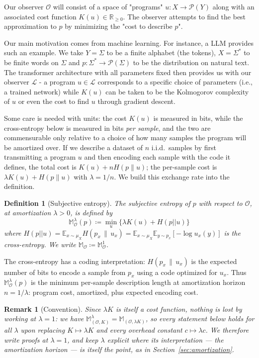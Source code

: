 \documentclass[11pt]{article}
\newtheorem{definition}{Definition}
\newtheorem{remark}{Remark}
\begin{document}
Our observer $\mathcal O$ will consist of a space of "programs" $u: X \to \mathcal P(Y)$ along with an associated cost function $K(u) \in \mathbb R_{\geq 0}$. The observer attempts to find the best approximation to $p$ by minimizing the "cost to describe $p$".

Our main motivation comes from machine learning. For instance, a LLM provides such an example. We take $Y = \Sigma$ to be a finite alphabet (the tokens), $X = \Sigma^*$ to be finite words on $\Sigma$ and $p: \Sigma^* \to \mathcal P(\Sigma)$ to be the distribution on natural text. The transformer architecture with all parameters fixed then provides us with our observer $\mathcal L$ - a program $u \in \mathcal L$ corresponds to a specific choice of parameters (i.e., a trained network) while $K(u)$ can be taken to be the Kolmogorov complexity of $u$ or even the cost to find $u$ through gradient descent.

Some care is needed with units: the cost $K(u)$ is measured in bits, while the cross-entropy below is measured in bits \emph{per sample}, and the two are commensurable only relative to a choice of how many samples the program will be amortized over. If we describe a dataset of $n$ i.i.d.\ samples by first transmitting a program $u$ and then encoding each sample with the code it defines, the total cost is $K(u) + n H(p\|u)$; the per-sample cost is $\lambda K(u) + H(p\|u)$ with $\lambda = 1/n$. We build this exchange rate into the definition.

\begin{definition}[Subjective entropy]
The subjective entropy of $p$ with respect to $\mathcal O$, at amortization $\lambda > 0$, is defined by
\[ \mathbb M^\lambda_\mathcal O(p) \coloneqq \min_u \{\lambda K(u) + H(p||u)\}  \]
where $H(p||u) = \mathbb E_{x \sim \mu_X} H(p_x \,\|\, u_x) = \mathbb E_{x \sim \mu_X}\mathbb{E}_{y \sim p_x}[-\log u_x(y)]$ is the cross-entropy. We write $\mathbb M_\mathcal O \coloneqq \mathbb M^1_\mathcal O$.

\end{definition}

The cross-entropy has a coding interpretation: $H(p_x \,\|\, u_x)$ is the expected number of bits
to encode a sample from $p_x$ using a code optimized for $u_x$. Thus $\mathbb{M}^\lambda_\mathcal{O}(p)$
is the minimum per-sample description length at amortization horizon $n = 1/\lambda$: program cost, amortized, plus expected encoding cost.

\begin{remark}[Convention]
Since $\lambda K$ is itself a cost function, nothing is lost by working at $\lambda = 1$: we have $\mathbb M^\lambda_{(\mathcal O, K)} = \mathbb M_{(\mathcal O, \lambda K)}$, so every statement below holds for all $\lambda$ upon replacing $K \mapsto \lambda K$ and every overhead constant $c \mapsto \lambda c$. We therefore write proofs at $\lambda = 1$, and keep $\lambda$ explicit where its interpretation --- the amortization horizon --- is itself the point, as in Section~\ref{sec:amortization}.
\end{remark}
\end{document}

